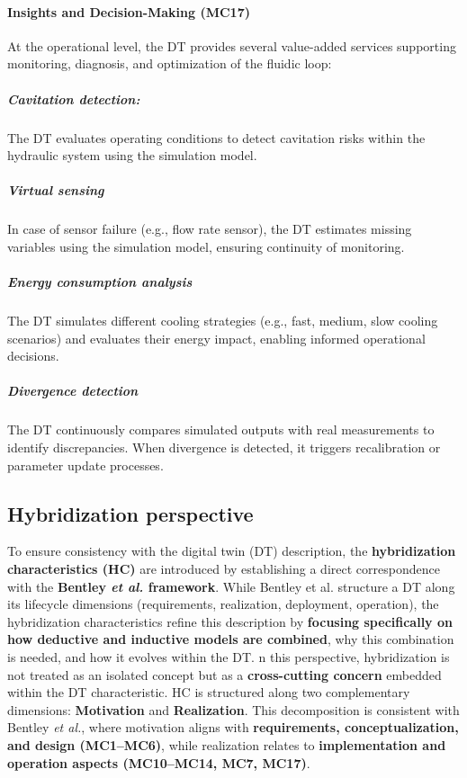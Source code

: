 \documentclass[
]{article}
\begin{document}
\paragraph{Insights and Decision-Making
(MC17)}\label{insights-and-decision-making-mc17}

At the operational level, the DT provides several value-added services
supporting monitoring, diagnosis, and optimization of the fluidic loop:

\subparagraph{\texorpdfstring{\textbf{Cavitation
detection:}}{Cavitation detection:}}\label{cavitation-detection}

The DT evaluates operating conditions to detect cavitation risks within
the hydraulic system using the simulation model.

\subparagraph{Virtual sensing}\label{virtual-sensing}

In case of sensor failure (e.g., flow rate sensor), the DT estimates
missing variables using the simulation model, ensuring continuity of
monitoring.

\subparagraph{Energy consumption
analysis}\label{energy-consumption-analysis}

The DT simulates different cooling strategies (e.g., fast, medium, slow
cooling scenarios) and evaluates their energy impact, enabling informed
operational decisions.

\subparagraph{Divergence detection}\label{divergence-detection}

The DT continuously compares simulated outputs with real measurements to
identify discrepancies. When divergence is detected, it triggers
recalibration or parameter update processes.\\

\subsection{Hybridization perspective}\label{hybridization-perspective}

To ensure consistency with the digital twin (DT) description, the
\textbf{hybridization characteristics (HC)} are introduced by
establishing a direct correspondence with the \textbf{Bentley \emph{et
al.} framework}. While Bentley et al. structure a DT along its lifecycle
dimensions (requirements, realization, deployment, operation), the
hybridization characteristics refine this description by
\textbf{focusing specifically on how deductive and inductive models are
combined}, why this combination is needed, and how it evolves within the
DT. n this perspective, hybridization is not treated as an isolated
concept but as a \textbf{cross-cutting concern} embedded within the DT
characteristic. HC is structured along two complementary dimensions:
\textbf{Motivation} and \textbf{Realization}. This decomposition is
consistent with Bentley \emph{et al.}, where motivation aligns with
\textbf{requirements, conceptualization, and design (MC1--MC6)}, while
realization relates to \textbf{implementation and operation aspects
(MC10--MC14, MC7, MC17)}.
\end{document}
